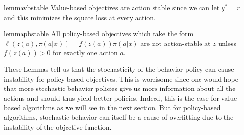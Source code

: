 







\begin{restatable}{lemma}{vbstable}\label{lem:vb-stable}
Value-based objectives are action stable since we can let $ y^* = r$ and this minimizes the square loss at every action.
\end{restatable}

\begin{restatable}{lemma}{pbstable}\label{lem:pb-stable}
All policy-based objectives which take the form \newline$\ell(z(a), \pi(a|x)) = f(z(a)) \pi(a|x)$ are not action-stable at $ z$ unless $ f(z(a)) > 0$ for exactly one action $ a$.
\end{restatable}

These Lemmas tell us that the stochasticity of the behavior policy can cause instability for policy-based objectives.
This is worrisome since one would hope that more stochastic behavior policies give us more information about all the actions and should thus yield better policies. Indeed, this is the case for value-based algorithms as we will see in the next section. But for policy-based algorithms, stochastic behavior can itself be a cause of overfitting due to the instability of the objective function.

